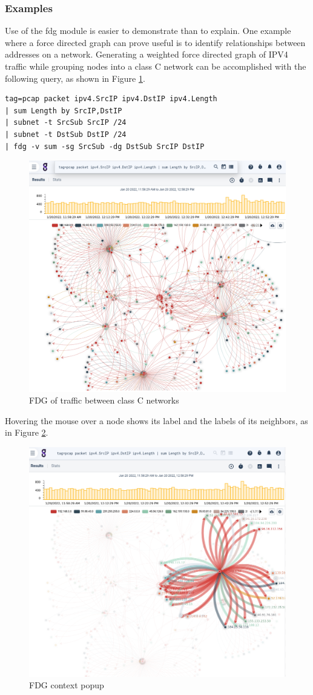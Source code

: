 \subsubsection{Examples}

Use of the fdg module is easier to demonstrate than to explain. One
example where a force directed graph can prove useful is to identify
relationships between addresses on a network. Generating a weighted
force directed graph of IPV4 traffic while grouping nodes into a class C
network can be accomplished with the following query, as shown in Figure \ref{fig:fdg-classC}.

\begin{Verbatim}[breaklines=true]
tag=pcap packet ipv4.SrcIP ipv4.DstIP ipv4.Length 
| sum Length by SrcIP,DstIP 
| subnet -t SrcSub SrcIP /24 
| subnet -t DstSub DstIP /24 
| fdg -v sum -sg SrcSub -dg DstSub SrcIP DstIP
\end{Verbatim}

\begin{figure}
	\includegraphics[width=0.6\linewidth]{images/fdg-classC.png}
	\caption{FDG of traffic between class C networks}
	\label{fig:fdg-classC}
\end{figure}

Hovering the mouse over a node shows its label and the labels of its
neighbors, as in Figure \ref{fig:fdg-context}.

\begin{figure}[H]
	\includegraphics[width=0.6\linewidth]{images/fdg-context.png}
	\caption{FDG context popup}
	\label{fig:fdg-context}
\end{figure}

